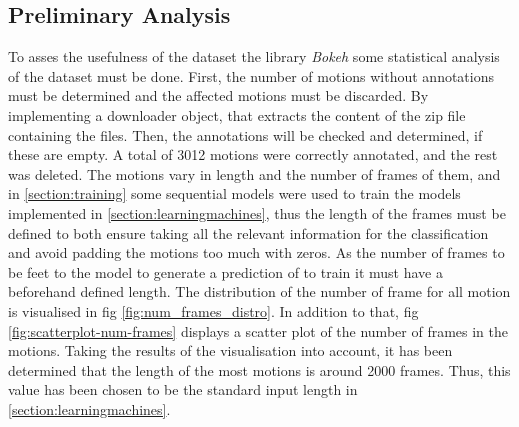 		\subsection{Preliminary Analysis}
			To asses the usefulness of the dataset the library \textit{Bokeh} some statistical analysis of the dataset must be done. First, the number of motions without annotations must be determined and the affected motions must be discarded. By implementing a downloader object, that extracts the content of the zip file containing the files. Then, the annotations will be checked and determined, if these are empty. A total of 3012 motions were correctly annotated, and the rest was deleted.\newline
			The motions vary in length and the number of frames of them, and in \ref{section:training} some sequential models were used to train the models implemented in \ref{section:learningmachines}, thus the length of the frames must be defined to both ensure taking all the relevant information for the classification and avoid padding the motions too much with zeros. As the number of frames to be feet to the model to generate a prediction of to train it must have a beforehand defined length. The distribution of the number of frame for all motion is visualised in fig \ref{fig:num_frames_distro}. In addition to that, fig \ref{fig:scatterplot-num-frames} displays a scatter plot of the number of frames in the motions. Taking the results of the visualisation into account, it has been determined that the length of the most motions is around 2000 frames. Thus, this value has been chosen to be the standard input length in \ref{section:learningmachines}.
